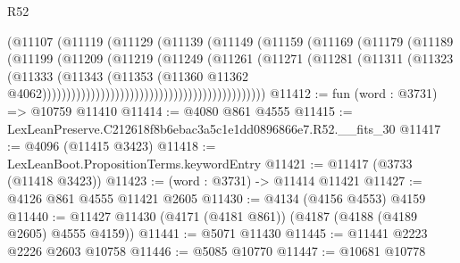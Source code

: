 \begin{lexlean}{R52}
\begin{coremodule}
                                                    (@11107
                                                      (@11119
                                                        (@11129
                                                          (@11139
                                                            (@11149
                                                              (@11159
                                                                (@11169
                                                                  (@11179
                                                                    (@11189
                                                                      (@11199
                                                                        (@11209
                                                                          (@11219
                                                                            (@11249
                                                                              (@11261
                                                                                (@11271
                                                                                  (@11281
                                                                                    (@11311
                                                                                      (@11323
                                                                                        (@11333
                                                                                          (@11343
                                                                                            (@11353
                                                                                              (@11360
                                                                                                @11362
                                                                                                @4062))))))))))))))))))))))))))))))))))))))))))))))
@11412 := fun (word : @3731) => @10759 @11410
@11414 := @4080 @861 @4555
@11415 := LexLeanPreserve.C212618f8b6ebac3a5c1e1dd0896866e7.R52.__fits_30
@11417 := @4096 (@11415 @3423)
@11418 := LexLeanBoot.PropositionTerms.keywordEntry
@11421 := @11417 (@3733 (@11418 @3423))
@11423 := (word : @3731) -> @11414 @11421
@11427 := @4126 @861 @4555 @11421 @2605
@11430 := @4134 (@4156 @4553) @4159
@11440 := @11427 @11430 (@4171 (@4181 @861)) (@4187 (@4188 (@4189 @2605) @4555 @4159))
@11441 := @5071 @11430
@11445 := @11441 @2223 @2226 @2603 @10758
@11446 := @5085 @10770
@11447 := @10681 @10778

\end{coremodule}
\end{lexlean}
